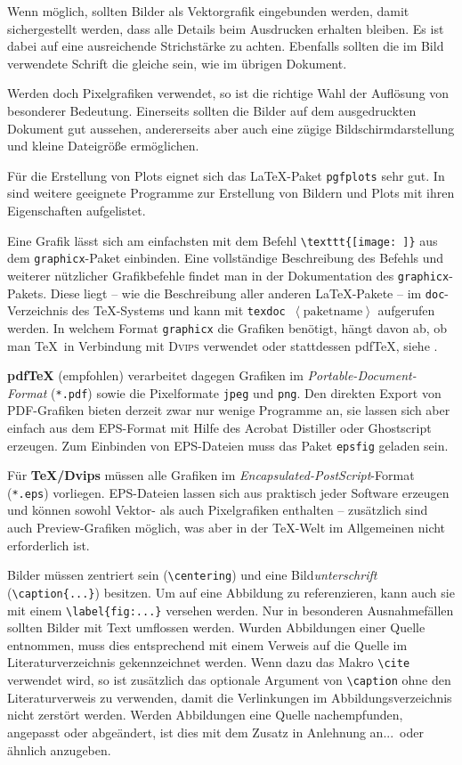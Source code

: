 Wenn möglich, sollten Bilder als Vektorgrafik eingebunden werden, damit sichergestellt werden, dass alle Details beim Ausdrucken erhalten bleiben.
Es ist dabei auf eine ausreichende Strichstärke zu achten.
Ebenfalls sollten die im Bild verwendete Schrift die gleiche sein, wie im übrigen Dokument.

Werden doch Pixelgrafiken verwendet, so ist die richtige Wahl der Auflösung von besonderer Bedeutung.
Einerseits sollten die Bilder auf dem ausgedruckten Dokument gut aussehen, andererseits aber auch eine zügige Bildschirmdarstellung und kleine Dateigröße ermöglichen.


Für die Erstellung von Plots eignet sich das \LaTeX-Paket \texttt{pgfplots} sehr gut.
In  sind weitere geeignete Programme zur Erstellung von Bildern und Plots mit ihren Eigenschaften aufgelistet.

Eine Grafik lässt sich am einfachsten mit dem Befehl \verb|\texttt{[image: ]}| aus dem \verb|graphicx|-Paket einbinden.
Eine vollständige Beschreibung des Befehls und weiterer nützlicher Grafikbefehle findet man in der Dokumentation des \verb|graphicx|-Pakets.
Diese liegt -- wie die Beschreibung aller anderen \LaTeX-Pakete -- im \verb|doc|-Verzeichnis des \TeX-Systems und kann mit \texttt{texdoc $\left\langle\text{paketname}\right\rangle$} aufgerufen werden.
In welchem Format \verb|graphicx| die Grafiken benötigt, hängt davon ab, ob man \TeX\ in Verbindung mit \textsc{Dvips} verwendet oder stattdessen pdf\TeX, siehe .

\textbf{pdf\TeX} (empfohlen) verarbeitet dagegen Grafiken im \emph{Portable-Document-Format} (\verb|*.pdf|) sowie die Pixelformate \texttt{jpeg} und \texttt{png}.
Den direkten Export von PDF-Grafiken bieten derzeit zwar nur wenige Programme an, sie lassen sich aber einfach aus dem EPS-Format mit Hilfe des Acrobat Distiller oder Ghostscript erzeugen.
Zum Einbinden von EPS-Dateien muss das Paket \texttt{epsfig} geladen sein.

Für \textbf{\TeX/Dvips} müssen alle Grafiken im \emph{Encapsulated-PostScript}-Format (\verb|*.eps|) vorliegen.
EPS-Dateien lassen sich aus praktisch jeder Software erzeugen und können sowohl Vektor- als auch Pixelgrafiken enthalten -- zusätzlich sind auch Preview-Grafiken möglich, was aber in der \TeX-Welt im Allgemeinen nicht erforderlich ist.

Bilder müssen zentriert sein (\verb|\centering|) und eine Bild\emph{unterschrift} (\verb|\caption{...}|) besitzen.
Um auf eine Abbildung zu referenzieren, kann auch sie mit einem \verb|\label{fig:...}| versehen werden.
Nur in besonderen Ausnahmefällen sollten Bilder mit Text umflossen werden.
Wurden Abbildungen einer Quelle entnommen, muss dies entsprechend mit einem Verweis auf die Quelle im Literaturverzeichnis gekennzeichnet werden.
Wenn dazu das Makro \verb|\cite| verwendet wird, so ist zusätzlich das optionale Argument von \verb|\caption| ohne den Literaturverweis zu verwenden, damit die Verlinkungen im Abbildungsverzeichnis nicht zerstört werden.
Werden Abbildungen eine Quelle nachempfunden, angepasst oder abgeändert, ist dies mit dem Zusatz \glqq in Anlehnung an...\grqq\ oder ähnlich anzugeben.

